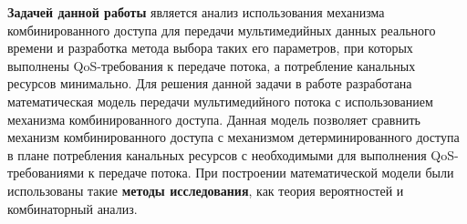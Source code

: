  
\textbf{Задачей данной работы} является анализ использования механизма комбинированного доступа для передачи мультимедийных данных реального времени и разработка метода выбора таких его параметров, при которых выполнены QoS-требования к передаче потока, а потребление канальных ресурсов минимально. Для решения данной задачи в работе разработана математическая модель передачи мультимедийного потока с использованием  механизма комбинированного доступа. Данная модель позволяет сравнить механизм комбинированного доступа с механизмом детерминированного доступа в плане потребления канальных ресурсов с необходимыми для выполнения QoS-требованиями к передаче потока. При построении математической модели были использованы такие \textbf{методы исследования}, как теория вероятностей и комбинаторный анализ.    



